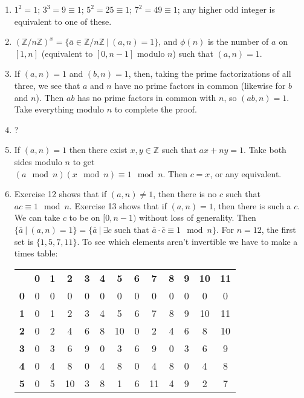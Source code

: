 \documentclass[]{article}
\newcommand{\bbz}{\mathbb{Z}}
\begin{document}
\begin{enumerate}
\item $1^2 = 1$; $3^3 = 9 \equiv 1$; $5^2 = 25 \equiv 1$; $7^2 = 49 \equiv 1$; any higher odd integer is equivalent to one of these.
\item $(\bbz / n \bbz)^x = \{ \bar{a} \in \bbz / n\bbz \ \vert\  (a,n) = 1 \}$, and $\phi(n)$ is the number of $a$ on $[1,n]$ (equivalent to $[0,n-1]$ modulo $n$) such that $(a,n) = 1$.
\item If $(a,n) = 1$ and $(b,n) = 1$, then, taking the prime factorizations of all three, we see that $a$ and $n$ have no prime factors in common (likewise for $b$ and $n$). Then $ab$ has no prime factors in common with $n$, so $(ab,n) = 1$. Take everything modulo $n$ to complete the proof.
\item {\color{red} ?}
\item If $(a,n) = 1$ then there exist $x,y\in\bbz$ such that $ax+ny=1$. Take both sides modulo $n$ to get \\ $(a\mod n)(x\mod n) \equiv 1\mod n$. Then $c = x$, or any equivalent.
\item Exercise 12 shows that if $(a,n) \neq 1$, then there is no $c$ such that $ac \equiv 1\mod n$. Exercise 13 shows that if $(a,n) = 1$, then there is such a $c$. We can take $c$ to be on $[0,n-1)$ without loss of generality. Then $\{ \bar{a} \ \vert\  (a,n) = 1 \} = \{ \bar{a} \ \vert\  \exists c\text{ such that }\bar{a}\cdot\bar{c} \equiv 1\mod n \}$. For $n=12$, the first set is $\{ 1,5,7,11 \}$. To see which elements aren't invertible we have to make a times table: 
\begin{center}
\begin{tabular}{c||c|c|c|c|c|c|c|c|c|c|c|c|}
& \textbf{0} & \textbf{1} & \textbf{2} & \textbf{3} & \textbf{4} & \textbf{5} & \textbf{6} & \textbf{7} & \textbf{8} & \textbf{9} & \textbf{10} & \textbf{11} \\
\hhline{|=|=|=|=|=|=|=|=|=|=|=|=|=|}
\textbf{0} & 0 & 0 & 0 & 0 & 0 & 0 & 0 & 0 & 0 & 0 & 0 & 0 \\ \hline
\textbf{1} & 0 & {\color{red} 1} & 2 & 3 & 4 & 5 & 6 & 7 & 8 & 9 & 10 & 11 \\ \hline
\textbf{2} & 0 & 2 & 4 & 6 & 8 & 10 & 0 & 2 & 4 & 6 & 8 & 10 \\ \hline
\textbf{3} & 0 & 3 & 6 & 9 & 0 & 3 & 6 & 9 & 0 & 3 & 6 & 9 \\ \hline
\textbf{4} & 0 & 4 & 8 & 0 & 4 & 8 & 0 & 4 & 8 & 0 & 4 & 8 \\ \hline
\textbf{5} & 0 & 5 & 10 & 3 & 8 & {\color{red} 1} & 6 & 11 & 4 & 9 & 2 & 7 \\ \hline

\end{tabular}
\end{center}
\end{enumerate}
\end{document}
